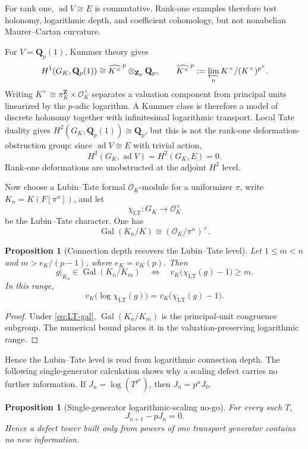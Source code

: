 \documentclass[11pt]{article}
\newtheorem{proposition}[theorem]{Proposition}
\theoremstyle{definition}
\newcommand{\Qp}{\mathbf Q_p}
\newcommand{\Zp}{\mathbf Z_p}
\newcommand{\OK}{\mathcal O_K}
\newcommand{\GK}{G_K}
\newcommand{\ad}{\operatorname{ad}}
\newcommand{\Gal}{\operatorname{Gal}}
\begin{document}
For rank one, $\ad V\cong E$ is commutative.  Rank-one examples therefore test holonomy, logarithmic depth, and coefficient cohomology, but not nonabelian Maurer--Cartan curvature.

For $V=\Qp(1)$, Kummer theory gives
\begin{equation}\label{eq:kummer}
H^1(\GK,\Qp(1))
\cong
\widehat{K^\times}^{\,p}\otimes_{\Zp}\Qp,
\qquad
\widehat{K^\times}^{\,p}:=\varprojlim_n K^\times/(K^\times)^{p^n}.
\end{equation}
Writing $K^\times\cong\pi_K^{\mathbf Z}\times\OK^\times$ separates a valuation component from principal units linearized by the $p$-adic logarithm.  A Kummer class is therefore a model of discrete holonomy together with infinitesimal logarithmic transport.  Local Tate duality gives $H^2(\GK,\Qp(1))\cong\Qp$, but this is not the rank-one deformation-obstruction group: since $\ad V\cong E$ with trivial action,
\[
H^2(\GK,\ad V)=H^2(\GK,E)=0.
\]
Rank-one deformations are unobstructed at the adjoint $H^2$ level.

Now choose a Lubin--Tate formal $\OK$-module for a uniformizer $\pi$, write $K_n=K(F[\pi^n])$, and let
\[
\chi_{\mathrm{LT}}:G_K\longrightarrow\OK^\times
\]
be the Lubin--Tate character.  One has
\begin{equation}\label{eq:LT-gal}
\Gal(K_n/K)\cong(\OK/\pi^n)^\times.
\end{equation}

\begin{proposition}[Connection depth recovers the Lubin--Tate level]\label{prop:LT-depth}
Let $1\le m<n$ and $m>e_K/(p-1)$, where $e_K=v_K(p)$.  Then
\[
g|_{K_n}\in\Gal(K_n/K_m)
\quad\Longleftrightarrow\quad
v_K\bigl(\chi_{\mathrm{LT}}(g)-1\bigr)\ge m.
\]
In this range,
\[
v_K\bigl(\log\chi_{\mathrm{LT}}(g)\bigr)
=v_K\bigl(\chi_{\mathrm{LT}}(g)-1\bigr).
\]
\end{proposition}

\begin{proof}
Under \eqref{eq:LT-gal}, $\Gal(K_n/K_m)$ is the principal-unit congruence subgroup.  The numerical bound places it in the valuation-preserving logarithmic range.
\end{proof}

Hence the Lubin--Tate level is read from logarithmic connection depth.  The following single-generator calculation shows why a scaling defect carries no further information.  If $J_n=\log(T^{p^n})$, then $J_n=p^nJ_0$.

\begin{proposition}[Single-generator logarithmic-scaling no-go]\label{prop:rank1-nogo}
For every such $T$,
\[
J_{n+1}-pJ_n=0.
\]
Hence a defect tower built only from powers of one transport generator contains no new information.
\end{proposition}
\end{document}
